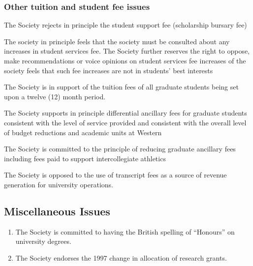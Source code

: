 \subsubsection{Other tuition and student fee issues}
\begin{longenum}[ label*=\thesubsubsection.\arabic*., align=left]
\item	The Society rejects in principle the student support fee (scholarship bursary fee) 
\item The society in principle feels that the society must be consulted about any increases in student services fee.  The Society further reserves the right to oppose, make recommendations or voice opinions on student services fee increases of the society feels that such fee increases are not in students' best interests
\item The Society is in support of the tuition fees of all graduate students being set upon a twelve (12) month period.
\item The Society supports in principle differential ancillary fees for graduate students consistent with the level of service provided and consistent with the overall level of budget reductions and academic units at Western 
\item The Society is committed to the principle of reducing graduate ancillary fees including fees paid to support intercollegiate athletics
\item The Society is opposed to the use of transcript fees as a source of revenue generation for university operations.
\end{longenum}

\subsection{Miscellaneous Issues}
\begin{enumerate}
\item The Society is committed to having the British spelling of ``Honours'' on university degrees. 
\item The Society endorses the 1997 change in allocation of research grants.
 
\end{enumerate}

